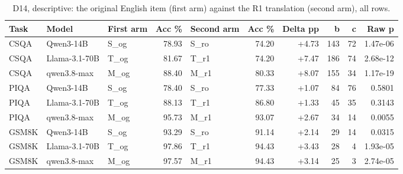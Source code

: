 \begin{table}[t]
\centering
\small
\caption{D14, descriptive: the original English item (first arm) against the R1 translation (second arm), all rows.}
\label{tab:d14-original}
\begin{tabular}{lllrlrrrrr}
\toprule
Task & Model & First arm & Acc \% & Second arm & Acc \% & Delta pp & b & c & Raw p \\
\midrule
CSQA & Qwen3-14B & S\_og & 78.93 & S\_ro & 74.20 & +4.73 & 143 & 72 & 1.47e-06 \\
CSQA & Llama-3.1-70B & T\_og & 81.67 & T\_r1 & 74.20 & +7.47 & 186 & 74 & 2.68e-12 \\
CSQA & qwen3.8-max & M\_og & 88.40 & M\_r1 & 80.33 & +8.07 & 155 & 34 & 1.17e-19 \\
PIQA & Qwen3-14B & S\_og & 78.40 & S\_ro & 77.33 & +1.07 & 84 & 76 & 0.5801 \\
PIQA & Llama-3.1-70B & T\_og & 88.13 & T\_r1 & 86.80 & +1.33 & 45 & 35 & 0.3143 \\
PIQA & qwen3.8-max & M\_og & 95.73 & M\_r1 & 93.07 & +2.67 & 34 & 14 & 0.0055 \\
GSM8K & Qwen3-14B & S\_og & 93.29 & S\_ro & 91.14 & +2.14 & 29 & 14 & 0.0315 \\
GSM8K & Llama-3.1-70B & T\_og & 97.86 & T\_r1 & 94.43 & +3.43 & 28 & 4 & 1.93e-05 \\
GSM8K & qwen3.8-max & M\_og & 97.57 & M\_r1 & 94.43 & +3.14 & 25 & 3 & 2.74e-05 \\
\bottomrule
\end{tabular}
\end{table}
